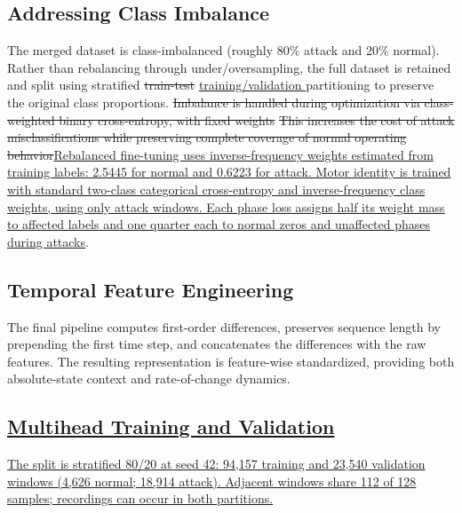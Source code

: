 \documentclass[conference,onecolumn,letterpaper]{IEEEtran} %
\providecommand{\DIFadd}[1]{{\protect\color{blue} \sf #1}} %
\providecommand{\DIFdel}[1]{{\protect\color{red} \scriptsize #1}} %
\providecommand{\DIFaddbegin}{} %
\providecommand{\DIFaddend}{} %
\providecommand{\DIFdelbegin}{} %
\providecommand{\DIFdelend}{} %
\renewcommand{\DIFadd}[1]{{\protect\color{blue}\protect\uline{#1}}}
\renewcommand{\DIFdel}[1]{{\protect\color{red}\protect\sout{#1}}}
\begin{document}
\subsection{Addressing Class Imbalance}
The merged dataset is class-imbalanced (roughly 80\% attack and 20\% normal). Rather than rebalancing through under/oversampling, the full dataset is retained and split using stratified \DIFdelbegin \DIFdel{train-test }\DIFdelend \DIFaddbegin \DIFadd{training/validation }\DIFaddend partitioning to preserve the original class proportions. \DIFdelbegin \DIFdel{Imbalance is handled during optimization via class-weighted binary cross-entropy, with fixed weights }\DIFdelend \DIFdelbegin \DIFdel{This increases the cost of attack misclassifications while preserving complete coverage of normal operating behavior}\DIFdelend \DIFaddbegin \DIFadd{Rebalanced fine-tuning uses inverse-frequency weights estimated from training labels: 2.5445 for normal and 0.6223 for attack. Motor identity is trained with standard two-class categorical cross-entropy and inverse-frequency class weights, using only attack windows. Each phase loss assigns half its weight mass to affected labels and one quarter each to normal zeros and unaffected phases during attacks}\DIFaddend .

\subsection{Temporal Feature Engineering}
The final pipeline computes first-order differences, preserves sequence length by prepending the first time step, and concatenates the differences with the raw features. The resulting representation is feature-wise standardized, providing both absolute-state context and rate-of-change dynamics.


\DIFaddbegin \subsection{\DIFadd{Multihead Training and Validation}}
\DIFadd{The split is stratified 80/20 at seed 42: 94,157 training and 23,540 validation windows (4,626 normal; 18,914 attack). Adjacent windows share 112 of 128 samples; recordings can occur in both partitions. 
}
\end{document}
